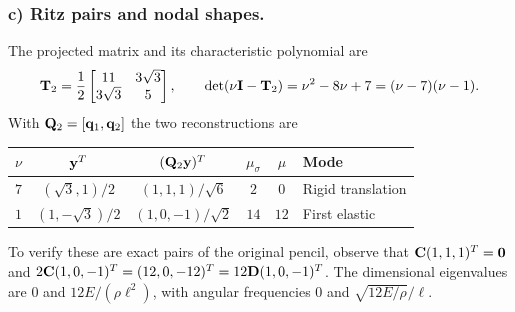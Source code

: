 \documentclass[12pt]{article}
\begin{document}
\subsubsection*{c) Ritz pairs and nodal shapes.}
The projected matrix and its characteristic polynomial are
\[
  \mathbf{T}_2=\frac12\begin{bmatrix}11&3\sqrt3\\3\sqrt3&5\end{bmatrix},\qquad
  \det(\nu\mathbf{I}-\mathbf{T}_2)=\nu^2-8\nu+7=(\nu-7)(\nu-1).
\]
With $\mathbf{Q}_2=[\mathbf{q}_1,\mathbf{q}_2]$ the two reconstructions are
\begin{center}
  \begin{tabular}{@{}cccccl@{}}
    \toprule
    $\nu$ & $\mathbf{y}^{T}$      & $(\mathbf{Q}_2\mathbf{y})^{T}$ & $\mu_\sigma$ & $\mu$ & Mode              \\
    \midrule
    $7$   & $(\sqrt3,1)/2$  & $(1,1,1)/\sqrt6$     & $2$          & $0$   & Rigid translation \\
    $1$   & $(1,-\sqrt3)/2$ & $(1,0,-1)/\sqrt2$    & $14$         & $12$  & First elastic     \\
    \bottomrule
  \end{tabular}
\end{center}
To verify these are exact pairs of the original pencil, observe that
$\mathbf{C}(1,1,1)^{T}=\mathbf{0}$ and
$2\mathbf{C}(1,0,-1)^{T}=(12,0,-12)^{T}=12\mathbf{D}(1,0,-1)^{T}$.
The dimensional eigenvalues are $0$ and $12E/(\rho\ell^2)$, with angular
frequencies $0$ and $\sqrt{12E/\rho}/\ell$.
\end{document}
